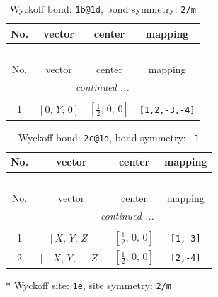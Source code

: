 \documentclass[fleqn,8pt]{jsarticle}
\begin{document}
\renewcommand{\arraystretch}{1.2}
\begin{longtable}{cccc}
\caption{Wyckoff bond: {\tt 1b@1d}, bond symmetry: {\tt 2/m}}
 \\
 \hline \hline
No. & vector & center & mapping \\ \hline \endfirsthead

\multicolumn{3}{l}{\tablename\ \thetable{}} \\
 \hline \hline
No. & vector & center & mapping \\ \hline \endhead

 \hline \hline
\multicolumn{3}{r}{\footnotesize\it continued ...} \\ \endfoot

 \hline \hline
\multicolumn{3}{r}{} \\ \endlastfoot

1 & $\left[ 0,\, Y,\, 0 \right]$ & $\left[ \frac{1}{2},\, 0,\, 0 \right]$ & {\tt [1,2,-3,-4]} \\
\end{longtable}
\renewcommand{\arraystretch}{1.2}
\begin{longtable}{cccc}
\caption{Wyckoff bond: {\tt 2c@1d}, bond symmetry: {\tt -1}}
 \\
 \hline \hline
No. & vector & center & mapping \\ \hline \endfirsthead

\multicolumn{3}{l}{\tablename\ \thetable{}} \\
 \hline \hline
No. & vector & center & mapping \\ \hline \endhead

 \hline \hline
\multicolumn{3}{r}{\footnotesize\it continued ...} \\ \endfoot

 \hline \hline
\multicolumn{3}{r}{} \\ \endlastfoot

1 & $\left[ X,\, Y,\, Z \right]$ & $\left[ \frac{1}{2},\, 0,\, 0 \right]$ & {\tt [1,-3]} \\ \hline
2 & $\left[ - X,\, Y,\, - Z \right]$ & $\left[ \frac{1}{2},\, 0,\, 0 \right]$ & {\tt [2,-4]} \\
\end{longtable}
* Wyckoff site: {\tt 1e}, site symmetry: {\tt 2/m}
\renewcommand{\arraystretch}{1.2}
\end{document}
